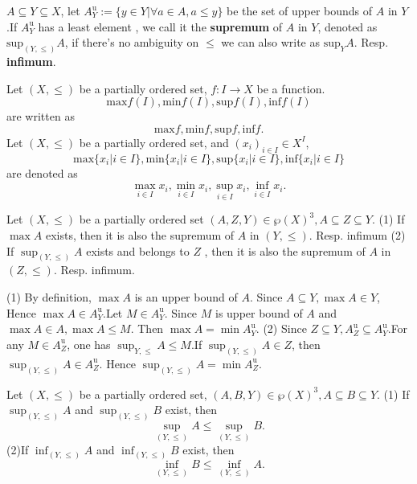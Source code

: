 \begin{definitionenv}
    $A\subseteq Y\subseteq X$, let $A_Y^\mathrm{u}:=\{y\in Y|\forall a\in A, a\le y\}$ be the set of upper bounds of $A$ in $Y$.If $A_Y^\mathrm{u}$ has a least element , we call it the \textbf{supremum} of $A$ in $Y$,  denoted as $\mathrm{sup}_{(Y, \le)}A$,  if there's no ambiguity on $\le$ we can also write as $\mathrm{sup}_{Y}A$. Resp. \textbf{infimum}.
\end{definitionenv}
\begin{notationenv}\label{notation4.5.1}
    
         Let $(X, \le)$ be a partially ordered set, $f:I\rightarrow X$ be a function.$$\mathrm{max}f(I), \mathrm{min}f(I), \mathrm{sup}f(I), \mathrm{inf}f(I)$$ are written as $$\mathrm{max}f, \mathrm{min}f, \mathrm{sup}f, \mathrm{inf}f.$$
         Let $(X, \le)$ be a partially ordered set, and $(x_i)_{i\in I}\in X^I$, $$\mathrm{max}\{x_i|i\in I\}, \mathrm{min}\{x_i|i\in I\}, \mathrm{sup}\{x_i|i\in I\}, \mathrm{inf}\{x_i|i\in I\}$$ are denoted as $$\max _{i\in I}x_i, \min _{i\in I}x_i, \sup _{i\in I}x_i, \inf _{i\in I}x_i.$$
    
\end{notationenv}
\begin{propositionenv}\label{proposition4.5.1}
    \quad
    \newline
    Let $(X, \le)$ be a partially ordered set $(A, Z, Y)\in \wp (X)^3, A\subseteq Z\subseteq Y$.
    \newline
   (1) If $\max A$ exists, then it is also the supremum of $A$ in $(Y, \le)$. Resp. infimum
    \newline
    (2) If $\sup_{(Y, \le)}A$ exists and belongs to $Z$ , then it is also the supremum of $A$ in $(Z, \le)$. Resp. infimum.
\end{propositionenv}
\begin{proofenv}
    \quad \newline
   (1) By definition, $\max A $ is an upper bound of $A$. Since $A\subseteq Y,  \max A \in Y$, Hence $\max A\in A_Y^\mathrm{u}$.Let $M\in A_Y^\mathrm{u} $. Since $M$ is upper bound of $A$ and $\max A\in A, \max A\le M$. Then $\max A=\min A_Y^\mathrm{u}$.
\newline
(2) Since $Z\subseteq Y, A_Z^\mathrm{u}\subseteq A_Y^\mathrm{u}$.For any $M\in A_Z^\mathrm{u}$, one has $\sup _{Y, \le}A\le M$.If $\sup_{(Y, \le)}A\in Z$, then $\sup_{(Y, \le)}A\in A_Z^\mathrm{u}$. Hence $\sup _{(Y, \le)}A=\min A_Z^\mathrm{u}$.
\end{proofenv}
\begin{propositionenv}\label{proposition4.5.2}
    \quad
    \newline
    Let $(X, \le )$ be a partially ordered set, $(A, B, Y)\in \wp (X)^3, A\subseteq B\subseteq Y$.
    \newline
    (1) If $\sup_{(Y, \le)}A$ and $\sup_{(Y, \le)}B$ exist,  then $$\sup_{(Y, \le)}A \le \sup_{(Y, \le)}B.$$
    \newline
    (2)If $\inf_{(Y, \le)}A$ and $\inf_{(Y, \le)}B$ exist,  then $$\inf_{(Y, \le)}B \le \inf_{(Y, \le)}A.$$
    
\end{propositionenv}
